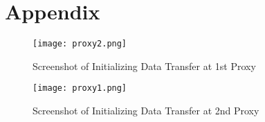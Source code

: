 \documentclass{article}
\begin{document}
\newpage
\section{Appendix}


\begin{figure}[!ht]
\label{fig:vi}
    \centering
    \texttt{[image: proxy2.png]}
    \caption{Screenshot of Initializing Data Transfer at 1st Proxy}
\end{figure}

\begin{figure}[!ht]
\label{fig:vi}
    \centering
    \texttt{[image: proxy1.png]}
    \caption{Screenshot of Initializing Data Transfer at 2nd Proxy}
\end{figure}
\end{document}
